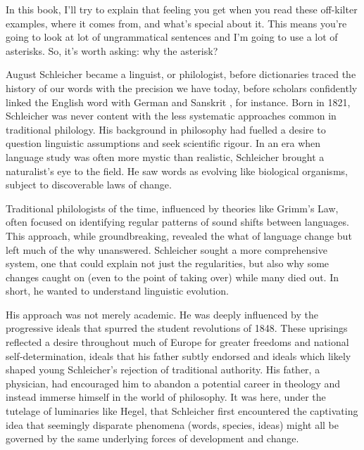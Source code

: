 In this book, I'll try to explain that feeling you get when you read these off-kilter examples, where it comes from, and what's special about it. This means you're going to look at lot of ungrammatical sentences and I'm going to use a lot of asterisks. So, it's worth asking: why the asterisk?

\bigskip

August Schleicher became a linguist, or philologist, before dictionaries traced the history of our words with the precision we have today, before scholars confidently linked the English word  with German  and Sanskrit , for instance. Born in 1821, Schleicher was never content with the less systematic approaches common in traditional philology. His background in philosophy had fuelled a desire to question linguistic assumptions and seek scientific rigour. In an era when language study was often more mystic than realistic, Schleicher brought a naturalist's eye to the field. He saw words as evolving like biological organisms, subject to discoverable laws of change.

Traditional philologists of the time, influenced by theories like Grimm's Law, often focused on identifying regular patterns of sound shifts between languages. This approach, while groundbreaking, revealed the what of language change but left much of the why unanswered. Schleicher sought a more comprehensive system, one that could explain not just the regularities, but also why some changes caught on (even to the point of taking over) while many died out. In short, he wanted to understand linguistic evolution.

His approach was not merely academic. He was deeply influenced by the progressive ideals that spurred the student revolutions of 1848. These uprisings reflected a desire throughout much of Europe for greater freedoms and national self-determination, ideals that his father subtly endorsed and ideals which likely shaped young Schleicher's rejection of traditional authority. His father, a physician, had encouraged him to abandon a potential career in theology and instead immerse himself in the world of philosophy. It was here, under the tutelage of luminaries like Hegel, that Schleicher first encountered the captivating idea that seemingly disparate phenomena (words, species, ideas) might all be governed by the same underlying forces of development and change.

